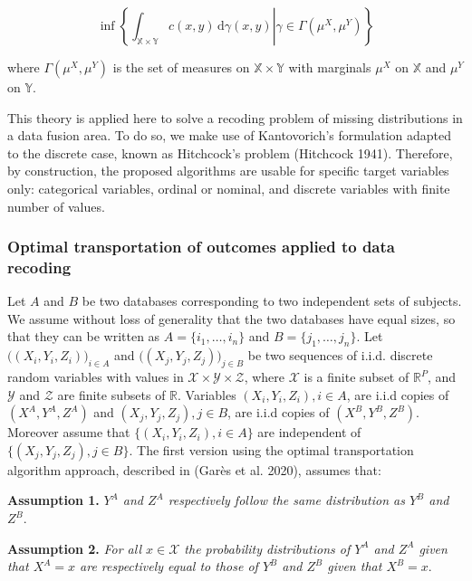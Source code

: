\begin{equation}
  \inf\left\{\left. \int_{{\mathbb{X}} \times {\mathbb{Y}}} c(x, y) \, \mathrm{d} \gamma (x,y) \right| \gamma \in \Gamma(\mu^X,\mu^Y) \right\}
\label{eq:kanto1}
\end{equation}

where \(\Gamma(\mu^X,\mu^Y)\) is the set of measures on \(\mathbb{X} \times \mathbb{Y}\) with marginals \(\mu^X\) on \(\mathbb{X}\) and \(\mu^Y\) on \(\mathbb{Y}\).

This theory is applied here to solve a recoding problem of missing distributions in a data fusion area. To do so, we make use of Kantovorich's formulation adapted to the discrete case, known as Hitchcock's problem (Hitchcock 1941). Therefore, by construction, the proposed algorithms are usable for specific target variables only: categorical variables, ordinal or nominal, and discrete variables with finite number of values.

\hypertarget{optt}{%
\subsubsection{Optimal transportation of outcomes applied to data recoding}\label{optt}}

Let \(A\) and \(B\) be two databases corresponding to two independent sets of subjects.
We assume without loss of generality that the two databases have equal sizes, so that they can be written as \(A=\{i_1,\dots,i_{n}\}\) and \(B=\{j_1,\dots,j_{n}\}\). Let \(\big((X_i,Y_i,Z_i)\big)_{i\in A}\) and \(\big((X_j,Y_j,Z_j)\big)_{j\in B}\) be two sequences of i.i.d. discrete random variables with values in \(\mathcal{X} \times \mathcal{Y} \times \mathcal{Z}\), where \(\mathcal{X}\) is a finite subset of \(\mathbb{R}^P\), and \(\mathcal{Y}\) and \(\mathcal{Z}\) are finite subsets of \(\mathbb{R}\). Variables \((X_i,Y_i,Z_i), i\in A\), are i.i.d copies of \((X^A,Y^A,Z^A)\) and \((X_j,Y_j,Z_j), j\in B\), are i.i.d copies of \((X^B,Y^B,Z^B)\). Moreover assume that \(\big\{(X_i,Y_i,Z_i),i\in A\big\}\) are independent of \(\big\{(X_j,Y_j,Z_j),j\in B\big\}\).
The first version using the optimal transportation algorithm approach, described in (Garès et al. 2020), assumes that:

\textbf{Assumption 1.} \emph{\(Y^A\) and \(Z^A\) respectively follow the same distribution as \(Y^B\) and \(Z^B\)}.

\textbf{Assumption 2.} \emph{For all \(x \in \mathcal{X}\) the probability distributions of \(Y^A\) and \(Z^A\) given that \(X^A= x\) are respectively equal to those of \(Y^B\) and \(Z^B\) given that \(X^B= x\)}.

